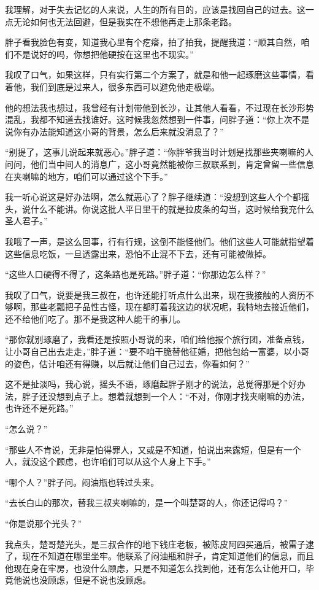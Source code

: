我理解，对于失去记忆的人来说，人生的所有目的，应该是找回自己的过去。这一点无论如何也无法回避，但是我实在不想他再走上那条老路。

胖子看我脸色有变，知道我心里有个疙瘩，拍了拍我，提醒我道：“顺其自然，咱们不是说好的吗，你想把他硬按在这里也不现实。”

我叹了口气，如果这样，只有实行第二个方案了，就是和他一起琢磨这些事情，看着他，我们到底是过来人，很多东西可以避免他走极端。

他的想法我也想过，我曾经有计划带他到长沙，让其他人看看，不过现在长沙形势混乱，我都不知道去找谁好。这时候我忽然想到一件事，问胖子道：“你上次不是说你有办法能知道这小哥的背景，怎么后来就没消息了？”

“别提了，这事儿说起来就恶心。”胖子道：“你胖爷我当时计划是找那些夹喇嘛的人问问，他们当中间人的消息广，这小哥竟然能被你三叔联系到，肯定曾留一些信息在夹喇嘛的地方，咱们可以通过这个下手。”

我一听心说这是好办法啊，怎么就恶心了？胖子继续道：“没想到这些人个个都摇头，说什么不能讲。你说这批人平日里干的就是拉皮条的勾当，这时候给我充什么圣人君子。”

我哦了一声，是这么回事，行有行规，这倒不能怪他们。他们这些人可能就指望着这些信息吃饭，一旦透露出来，恐怕不止混不下去，还有可能被做掉。

“这些人口硬得不得了，这条路也是死路。”胖子道：“你那边怎么样？”

我叹了口气，说要是我三叔在，也许还能打听点什么出来，现在我接触的人资历不够啊，那些老瓢把子品性古怪，现在都盯着我这边的状况呢，我特地去接近他们，还不给他们吃了。那不是我这种人能干的事儿。

“那你就别琢磨了，我看还是按照小哥说的来，咱们给他报个旅行团，准备点钱，让小哥自己出去走走，”胖子道：“要不咱干脆替他征婚，把他包给一富婆，以小哥的姿色，估计咱还有得赚，以后就让他们自己过去，你看如何？”

这不是扯淡吗，我心说，摇头不语，琢磨起胖子刚才的说法，总觉得那是个好办法，胖子还没想到点子上。想着就想到一个人：“不对，你刚才找夹喇嘛的办法，也许还不是死路。”

“怎么说？”

“那些人不肯说，无非是怕得罪人，又或是不知道，怕说出来露短，但是有一个人，就没这个顾虑，也许咱们可以从这个人身上下手。”

“哪个人？”胖子问。闷油瓶也转过头来。

“去长白山的那次，替我三叔夹喇嘛的，是一个叫楚哥的人，你还记得吗？”

“你是说那个光头？”

我点头，楚哥楚光头，是三叔合作的地下钱庄老板，被陈皮阿四买通后，被雷子逮了，现在不知道在哪里坐牢。他联系了闷油瓶和胖子，肯定知道他们的信息，而且他现在身在牢房，也没什么顾虑，只是不知道怎么找到他，还有怎么让他开口，毕竟他说也没顾虑，但是不说也没顾虑。

